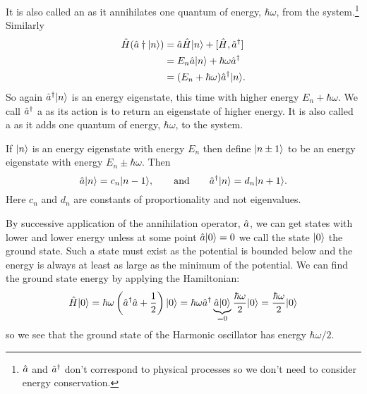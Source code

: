     It is also called an  as it annihilates one quantum of energy, \(\hbar\omega\), from the system.\footnote{\(\hat{a}\) and \(\hat{a}^\dagger\) don't correspond to physical processes so we don't need to consider energy conservation.}
    Similarly
    \begin{align*}
        \hat{H}(\hat{a}\dagger\vert {n} \rangle) &= \hat{a}\hat{H}\vert {n} \rangle + [\hat{H}, \hat{a}^\dagger]\\
        &= E_n\hat{a}\vert {n} \rangle + \hbar\omega\hat{a}^\dagger\\
        &= (E_n + \hbar\omega)\hat{a}^\dagger\vert {n} \rangle.
    \end{align*}
    So again \(\hat{a}^\dagger\vert {n} \rangle\) is an energy eigenstate, this time with higher energy \(E_n + \hbar\omega\).
    We call \(\hat{a}^\dagger\) a  as its action is to return an eigenstate of higher energy.
    It is also called a  as it adds one quantum of energy, \(\hbar\omega\), to the system.
    
    If \(\vert {n} \rangle\) is an energy eigenstate with energy \(E_n\) then define \(\vert {n\pm 1} \rangle\) to be an energy eigenstate with energy \(E_n \pm \hbar\omega\).
    Then
    \[\hat{a}\vert {n} \rangle = c_n\vert {n - 1} \rangle,\qquad\text{and}\qquad \hat{a}^\dagger\vert {n} \rangle = d_n\vert {n + 1} \rangle.\]
    Here \(c_n\) and \(d_n\) are constants of proportionality and not eigenvalues.
    
    By successive application of the annihilation operator, \(\hat{a}\), we can get states with lower and lower energy unless at some point \(\hat{a}\vert {0} \rangle = 0\) we call the state \(\vert {0} \rangle\) the ground state.
    Such a state must exist as the potential is bounded below and the energy is always at least as large as the minimum of the potential.
    We can find the ground state energy by applying the Hamiltonian:
    \[\hat{H}\vert {0} \rangle = \hbar\omega \left(\hat{a}^\dagger\hat{a} + \frac{1}{2}\right)\vert {0} \rangle =  \hbar\omega\hat{a}^\dagger\underbrace{\hat{a}\vert {0} \rangle}_{=0}\frac{\hbar\omega}{2}\vert {0} \rangle = \frac{\hbar\omega}{2}\vert {0} \rangle\]
    so we see that the ground state of the Harmonic oscillator has energy \(\hbar\omega/2\).
    
